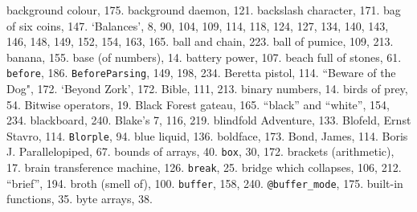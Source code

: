 background colour, 175.
background daemon, 121.
backslash character, 171.
bag of six coins, 147.
`Balances', 8, 90, 104, 109, 114, 118, 124, 127, 134, 140, 143, 146, 148, 149, 152, 154, 163, 165.
ball and chain, 223.
ball of pumice, 109, 213.
banana, 155.
base (of numbers), 14.
battery power, 107.
beach full of stones, 61.
{{\tt before}}, 186.
{{\tt BeforeParsing}}, 149, 198, 234.
Beretta pistol, 114.
``Beware of the Dog", 172.
`Beyond Zork', 172.
Bible, 111, 213.
binary numbers, 14.
birds of prey, 54.
Bitwise operators, 19.
Black Forest gateau, 165.
``black'' and ``white'', 154, 234.
blackboard, 240.
Blake's 7, 116, 219.
blindfold Adventure, 133.
Blofeld, Ernst Stavro, 114.
{{\tt Blorple}}, 94.
blue liquid, 136.
boldface, 173.
Bond, James, 114.
Boris J. Parallelopiped, 67.
bounds of arrays, 40.
{{\tt box}}, 30, 172.
brackets (arithmetic), 17.
brain transference machine, 126.
{{\tt break}}, 25.
bridge which collapses, 106, 212.
``brief'', 194.
broth (smell of), 100.
{{\tt buffer}}, 158, 240.
{{\tt @buffer\_mode}}, 175.
built-in functions, 35.
byte arrays, 38.

